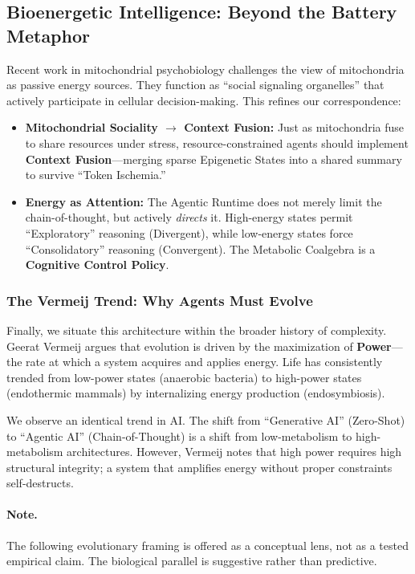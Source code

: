 \subsection{Bioenergetic Intelligence: Beyond the Battery Metaphor}

Recent work in mitochondrial psychobiology \cite{allen2022energy, picard2022signaling} challenges the view of
mitochondria as passive energy sources. They function as ``social signaling organelles'' that actively participate
in cellular decision-making. This refines our correspondence:
\begin{itemize}[leftmargin=*]
\item \textbf{Mitochondrial Sociality $\to$ Context Fusion:} Just as mitochondria fuse to share resources under
stress, resource-constrained agents should implement \textbf{Context Fusion}---merging sparse Epigenetic States
into a shared summary to survive ``Token Ischemia.''
\item \textbf{Energy as Attention:} The Agentic Runtime does not merely limit the chain-of-thought, but actively
\textit{directs} it. High-energy states permit ``Exploratory'' reasoning (Divergent), while low-energy states
force ``Consolidatory'' reasoning (Convergent). The Metabolic Coalgebra is a \textbf{Cognitive Control Policy}.
\end{itemize}

\subsubsection{The Vermeij Trend: Why Agents Must Evolve}

Finally, we situate this architecture within the broader history of complexity. Geerat Vermeij \cite{vermeij2023power}
argues that evolution is driven by the maximization of \textbf{Power}---the rate at which a system acquires and
applies energy. Life has consistently trended from low-power states (anaerobic bacteria) to high-power states
(endothermic mammals) by internalizing energy production (endosymbiosis).

We observe an identical trend in AI. The shift from ``Generative AI'' (Zero-Shot) to ``Agentic AI'' (Chain-of-Thought)
is a shift from low-metabolism to high-metabolism architectures. However, Vermeij notes that high power requires
high structural integrity; a system that amplifies energy without proper constraints self-destructs.

\paragraph{Note.}
The following evolutionary framing is offered as a conceptual lens, not as a
tested empirical claim.  The biological parallel is suggestive rather than
predictive.

